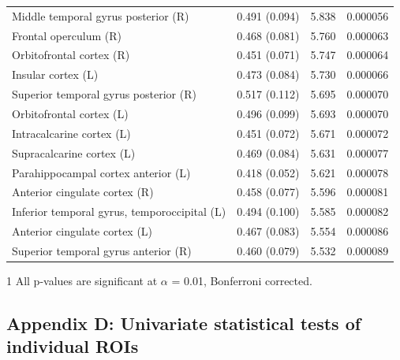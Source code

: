 \documentclass[jou,12pt,a4paper]{apa6}
\begin{document}
\begin{table}[ht]
\begin{threeparttable}
\begin{tabular*}{1\textwidth}{l @{\extracolsep{\fill}} lll}
Middle temporal gyrus posterior (R)                 & 0.491 (0.094)               & 5.838            & 0.000056         \\
Frontal operculum (R)          & 0.468 (0.081)               & 5.760            & 0.000063         \\
Orbitofrontal cortex (R)             & 0.451 (0.071)               & 5.747            & 0.000064         \\
Insular cortex (L)              & 0.473 (0.084)               & 5.730            & 0.000066         \\
Superior temporal gyrus posterior (R)                 & 0.517 (0.112)               & 5.695            & 0.000070         \\
Orbitofrontal cortex (L)              & 0.496 (0.099)               & 5.693            & 0.000070         \\
Intracalcarine cortex (L)       & 0.451 (0.072)               & 5.671            & 0.000072         \\
Supracalcarine cortex (L)       & 0.469 (0.084)               & 5.631            & 0.000077         \\
Parahippocampal cortex anterior (L)       & 0.418 (0.052)               & 5.621            & 0.000078         \\
Anterior cingulate cortex (R)                       & 0.458 (0.077)               & 5.596            & 0.000081         \\
Inferior temporal gyrus, temporoccipital (L)               & 0.494 (0.100)               & 5.585            & 0.000082         \\
Anterior cingulate cortex (L)                        & 0.467 (0.083)               & 5.554            & 0.000086         \\
Superior temporal gyrus anterior (R)                  & 0.460 (0.079)               & 5.532            & 0.000089         \\ \hline

\end{tabular*}
\begin{tablenotes} 
		\item [1] \small{All p-values are significant at $\alpha$ = 0.01, Bonferroni corrected.}
		\end{tablenotes}
\end{threeparttable}
\end{table}

\newpage
\vspace*{1px}
\subsection{\LARGE \textnormal{Appendix D: Univariate statistical tests of individual ROIs}}
\vspace{10px}
\end{document}
